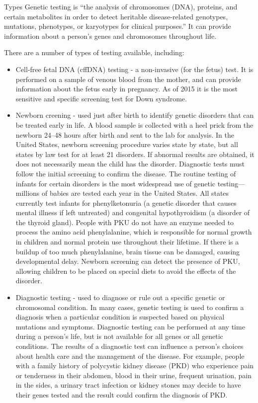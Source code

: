 Types
Genetic testing is ``the analysis of chromosomes (DNA), proteins, and certain metabolites in order to detect heritable disease-related genotypes, mutations, phenotypes, or karyotypes for clinical purposes.'' It can provide information about a person's genes and chromosomes throughout life.

There are a number of types of testing available, including:

\begin{itemize}
\tightlist
\item
  Cell-free fetal DNA (cffDNA) testing - a non-invasive (for the fetus) test. It is performed on a sample of venous blood from the mother, and can provide information about the fetus early in pregnancy. As of 2015 it is the most sensitive and specific screening test for Down syndrome.
\item
  Newborn creening - used just after birth to identify genetic disorders that can be treated early in life. A blood sample is collected with a heel prick from the newborn 24--48 hours after birth and sent to the lab for analysis. In the United States, newborn screening procedure varies state by state, but all states by law test for at least 21 disorders. If abnormal results are obtained, it does not necessarily mean the child has the disorder. Diagnostic tests must follow the initial screening to confirm the disease. The routine testing of infants for certain disorders is the most widespread use of genetic testing---millions of babies are tested each year in the United States. All states currently test infants for phenylketonuria (a genetic disorder that causes mental illness if left untreated) and congenital hypothyroidism (a disorder of the thyroid gland). People with PKU do not have an enzyme needed to process the amino acid phenylalanine, which is responsible for normal growth in children and normal protein use throughout their lifetime. If there is a buildup of too much phenylalanine, brain tissue can be damaged, causing developmental delay. Newborn screening can detect the presence of PKU, allowing children to be placed on special diets to avoid the effects of the disorder.
\item
  Diagnostic testing - used to diagnose or rule out a specific genetic or chromosomal condition. In many cases, genetic testing is used to confirm a diagnosis when a particular condition is suspected based on physical mutations and symptoms. Diagnostic testing can be performed at any time during a person's life, but is not available for all genes or all genetic conditions. The results of a diagnostic test can influence a person's choices about health care and the management of the disease. For example, people with a family history of polycystic kidney disease (PKD) who experience pain or tenderness in their abdomen, blood in their urine, frequent urination, pain in the sides, a urinary tract infection or kidney stones may decide to have their genes tested and the result could confirm the diagnosis of PKD.

\end{itemize}
